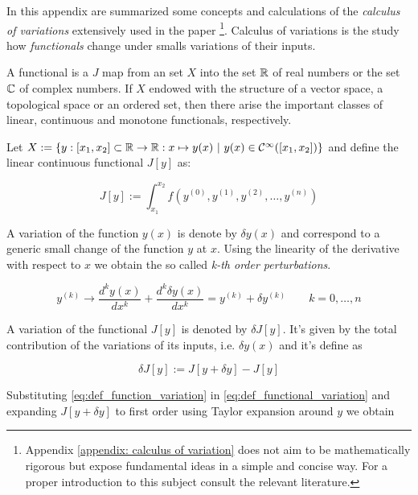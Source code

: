 In this appendix are summarized some concepts and calculations of the
\emph{calculus of variations} extensively used in the paper
\footnote{
  Appendix \ref{appendix: calculus of variation} does not aim to be
  mathematically rigorous but expose fundamental ideas in a simple and concise
  way. For a proper introduction to this subject consult the relevant
  literature.
}.
Calculus of variations is the study how \emph{functionals} change under smalls
variations of their inputs.

\begin{definition}
  \cite{Functional_Encyclopedia_of_Mathematics}
  A functional is a $J$ map from an set $X$ into the set $\mathbb{R}$ of real
  numbers or the set $\mathbb{C}$ of complex numbers. If $X$ endowed with the
  structure of a vector space, a topological space or an ordered set, then
  there arise the important classes of linear, continuous and monotone
  functionals, respectively.
\end{definition}

Let $X:=\{y: [x_1, x_2] \subset \mathbb{R} \rightarrow \mathbb{R}: x \mapsto
y(x) \ | \ y(x) \in \mathcal{C}^{\infty}([x_1, x_2])\}$ and define the linear
continuous functional $J[y]$ as:

\begin{equation} \label{eq:def_functional}
  J[y] := \int_{x_1}^{x_2} f(y^{(0)}, y^{(1)}, y^{(2)}, \ldots, y^{(n)})
\end{equation}

A variation of the function $y(x)$ is denote by $\delta y(x)$ and correspond to
a generic small change of the function $y$ at $x$. Using the linearity of the
derivative with respect to $x$ we obtain the so called \emph{k-th order
perturbations}.

\begin{equation} \label{eq:def_function_variation}
  y^{(k)} \rightarrow \frac{d^ky(x)}{dx^k} + \frac{d^k\delta y(x)}{dx^k} =
  y^{(k)} + \delta y^{(k)} \qquad k=0, \ldots, n
\end{equation}

A variation of the functional $J[y]$ is denoted by $\delta J[y]$. It's given by
the total contribution of the variations of its inputs, i.e. $\delta y(x)$ and
it's define as

\begin{equation} \label{eq:def_functional_variation}
  \delta J[y] := J[y + \delta y] - J[y]
\end{equation}

Substituting \eqref{eq:def_function_variation} in
\eqref{eq:def_functional_variation} and expanding $J[y + \delta y]$ to first
order using Taylor expansion around $y$ we obtain

